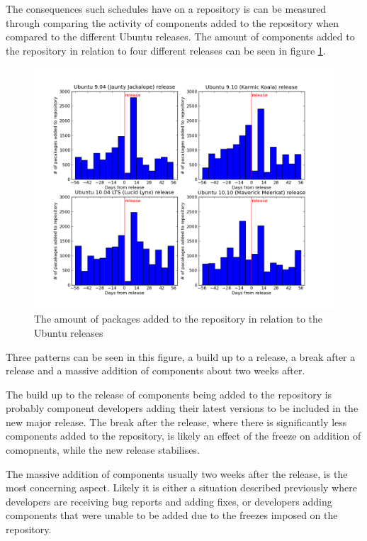 The consequences such schedules have on a repository is can be measured through comparing the activity of components added to the repository when compared to the different Ubuntu releases.
The amount of components added to the repository in relation to four different releases can be seen in figure \ref{ubuntureleases}.

\begin{figure}[htp]
\begin{center}
  \includegraphics[width=\textwidth]{ubuntusimulationpics/releasedatepacakges}
  \caption[labelInTOC]{The amount of packages added to the repository in relation to the Ubuntu releases}
  \label{ubuntureleases}
\end{center}
\end{figure}

Three patterns can be seen in this figure, a build up to a release, a break after a release and a massive addition of components about two weeks after.

The build up to the release of components being added to the repository is probably component developers adding their latest versions to be included in the new major release.
The break after the release, where there is significantly less components added to the repository, is likely an effect of the freeze on addition of comopnents, while the new release stabilises.

The massive addition of components usually two weeks after the release, is the most concerning aspect.
Likely it is either a situation described previously where developers are receiving bug reports and adding fixes, 
or developers adding components that were unable to be added due to the freezes imposed on the repository. 

